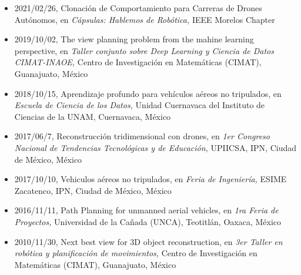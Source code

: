 \begin{itemize} 
\item 2021/02/26, Clonación de Comportamiento para Carreras de Drones Autónomos, en \textit{ Cápsulas: Hablemos de Robótica,} IEEE Morelos Chapter 
\item 2019/10/02, The view planning problem from the mahine learning perspective, en \textit{ Taller conjunto sobre Deep Learning y Ciencia de Datos CIMAT-INAOE,} Centro de Investigación en Matemáticas (CIMAT), Guanajuato, México 
\item 2018/10/15, Aprendizaje profundo para vehículos aéreos no tripulados, en \textit{ Escuela de Ciencia de los Datos,} Unidad Cuernavaca del Instituto de Ciencias de la UNAM, Cuernavaca, México 
\item 2017/06/7, Reconstrucción tridimensional con drones, en \textit{ 1er Congreso Nacional de Tendencias Tecnológicas y de Educación,} UPIICSA, IPN, Ciudad de México, México 
\item 2017/10/10, Vehiculos aéreos no tripulados, en \textit{ Feria de Ingeniería,} ESIME Zacatenco, IPN, Ciudad de México, México 
\item 2016/11/11, Path Planning for unmanned aerial vehicles, en \textit{ 1ra Feria de Proyectos,} Universidad de la Cañada (UNCA), Teotitlán, Oaxaca, México 
\item 2010/11/30, Next best view for 3D object reconstruction, en \textit{ 3er Taller en robótica y planificación de movimientos,} Centro de Investigación en Matemáticas (CIMAT), Guanajuato, México 
\end{itemize} 
